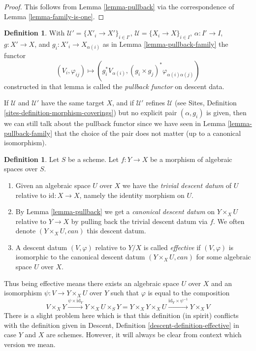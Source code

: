 \documentclass{stacks-project}
\theoremstyle{plain}
\theoremstyle{definition}
\newtheorem{definition}[subsection]{Definition}
\theoremstyle{remark}
\numberwithin{equation}{subsection}
\begin{document}
\begin{proof}
This follows from Lemma \ref{lemma-pullback} via the
correspondence of Lemma \ref{lemma-family-is-one}.
\end{proof}

\begin{definition}
\label{definition-pullback-functor-family}
With $\mathcal{U}' = \{X'_i \to X'\}_{i \in I'}$,
$\mathcal{U} = \{X_i \to X\}_{i \in I}$, $\alpha : I' \to I$,
$g : X' \to X$, and $g_i : X'_i \to X_{\alpha(i)}$ as in
Lemma \ref{lemma-pullback-family} the functor
$$
(V_i, \varphi_{ij}) \longmapsto
(g_i^*V_{\alpha(i)}, (g_i \times g_j)^*\varphi_{\alpha(i) \alpha(j)})
$$
constructed in that lemma
is called the {\it pullback functor} on descent data.
\end{definition}

\noindent
If $\mathcal{U}$ and $\mathcal{U}'$ have the same target $X$,
and if $\mathcal{U}'$ refines $\mathcal{U}$ (see
Sites, Definition \ref{sites-definition-morphism-coverings})
but no explicit pair $(\alpha, g_i)$ is given, then we can still
talk about the pullback functor since we have seen in
Lemma \ref{lemma-pullback-family} that the choice of the pair does not matter
(up to a canonical isomorphism).

\begin{definition}
\label{definition-effective}
Let $S$ be a scheme. Let $f : Y \to X$ be a morphism of algebraic spaces over
$S$.
\begin{enumerate}
\item Given an algebraic space $U$ over $X$ we have the
{\it trivial descent datum} of $U$ relative to $\text{id} : X \to X$, namely
the identity morphism on $U$.
\item By Lemma \ref{lemma-pullback} we get a
{\it canonical descent datum} on $Y \times_X U$
relative to $Y \to X$ by pulling back the trivial
descent datum via $f$. We often
denote $(Y \times_X U, can)$ this descent datum.
\item A descent datum $(V, \varphi)$ relative to $Y/X$
is called {\it effective} if $(V, \varphi)$
is isomorphic to the canonical descent datum
$(Y \times_X U, can)$ for some algebraic space $U$ over $X$.
\end{enumerate}
\end{definition}

\noindent
Thus being effective means there exists an algebraic space $U$
over $X$ and an isomorphism $\psi : V \to Y \times_X U$
over $Y$ such that $\varphi$ is equal to the composition
$$
V \times_X Y \xrightarrow{\psi \times \text{id}_Y}
Y \times_X U \times_S Y =
Y \times_X Y \times_X U
\xrightarrow{\text{id}_Y \times \psi^{-1}}
Y \times_X V
$$
There is a slight problem here which is that this definition
(in spirit) conflicts with the definition given in
Descent, Definition \ref{descent-definition-effective}
in case $Y$ and $X$ are schemes. However, it will always be clear from
context which version we mean.
\end{document}

